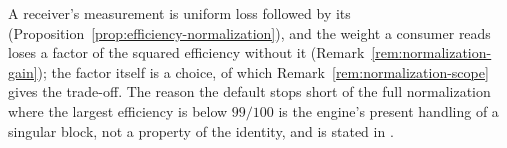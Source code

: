 
A receiver's measurement is uniform loss followed by its 
(Proposition~\ref{prop:efficiency-normalization}), and the weight a
consumer reads loses a factor of the squared efficiency without it
(Remark~\ref{rem:normalization-gain}); the factor itself is a choice, of which
Remark~\ref{rem:normalization-scope} gives the trade-off. The reason the
default stops short of the full normalization where the largest efficiency
is below $99/100$ is the engine's present handling of a singular block, not a
property of the identity, and is stated in
.

